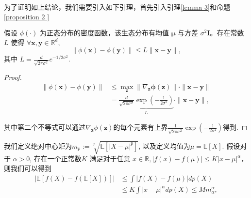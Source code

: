 为了证明如上结论，我们需要引入如下引理，首先引入引理\ref{lemma 3}和命题\ref{proposition 2 }
\begin{lemma}
\label{lemma 3}
     假设 $\phi(\cdot)$ 为正态分布的密度函数，该生态分布有均值   $\boldsymbol{\mu}$ 与方差 $\sigma^2 \boldsymbol{I}$。存在常数$L$ 使得 $\forall \boldsymbol{x}, \boldsymbol{y} \in \mathbb{R}^d$,
\begin{equation}
    \|\phi(\boldsymbol{x})-\phi(\boldsymbol{y})\| \leq L\|\boldsymbol{x}-\boldsymbol{y}\|,
    \label{Lipschitz condition}
\end{equation}
其中 $L=\frac{d}{\sqrt{2 \pi \sigma^2}} e^{-1 / 2 \sigma^2}$.
\end{lemma}
\begin{proof}
    \begin{align}
\|\phi(\boldsymbol{x})-\phi(\boldsymbol{y})\| & \leq \max _{\boldsymbol{z}}\left\|\nabla_{\boldsymbol{z}} \boldsymbol{\phi}(\boldsymbol{z})\right\| \cdot\|\boldsymbol{x}-\boldsymbol{y}\| \\
& =\underbrace{\frac{d}{\sqrt{2 \pi \sigma^2}} \exp \left(-\frac{1}{2 \sigma^2}\right)}_L \cdot\|\boldsymbol{x}-\boldsymbol{y}\|,
\end{align}

其中第二个不等式可以通过$\nabla_{\boldsymbol{z}} \phi(\boldsymbol{z})$的每个元素有上界$\frac{1}{\sqrt{2 \pi \sigma^2}} \exp \left(-\frac{1}{2 \sigma^2}\right)$得到.
\end{proof}


\begin{proposition}[Jesen误差上界估计]
\label{proposition 2 }

     我们定义绝对中心矩为$m_p:=\sqrt[p]{\mathbb{E}\left[|X-\mu|^p\right]}$, 以及定义均值为$\mu=\mathbb{E}[X]$. 假设对于 $\alpha>0$, 存在一个正常数$K$ 满足对于任意 $x \in \mathbb{R},|f(x)-f(\mu)| \leq K|x-\mu|^\alpha$，则我们可以得到
\begin{align}
|\mathbb{E}[f(X)-f(\mathbb{E}[X])]| & \leq \int|f(X)-f(\mu)| d p(X) \\
& \leq K \int|x-\mu|^\alpha d p(X) \leq M m_\alpha^\alpha,
\end{align}
\end{proposition}

